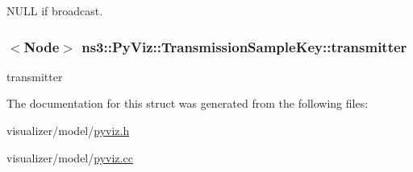 N\+U\+LL if broadcast. 

\subsubsection[{\texorpdfstring{transmitter}{transmitter}}]{$<${\bf Node}$>$ ns3\+::\+Py\+Viz\+::\+Transmission\+Sample\+Key\+::transmitter}\hypertarget{structns3_1_1PyViz_1_1TransmissionSampleKey_a97e1eb5e6a2e1cc5fa7abe5a0ef9d5ce}{}\label{structns3_1_1PyViz_1_1TransmissionSampleKey_a97e1eb5e6a2e1cc5fa7abe5a0ef9d5ce}


transmitter 



The documentation for this struct was generated from the following files\+:\begin{DoxyCompactItemize}
\item 
visualizer/model/\hyperlink{pyviz_8h}{pyviz.\+h}\item 
visualizer/model/\hyperlink{pyviz_8cc}{pyviz.\+cc}\end{DoxyCompactItemize}

